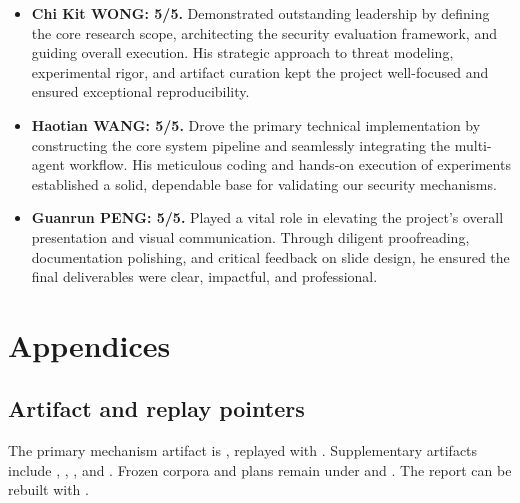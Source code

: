 \documentclass[journal]{IEEEtran}
\begin{document}
\begin{itemize}
\item \textbf{Chi Kit WONG: 5/5.}
    Demonstrated outstanding leadership by defining the core research scope, architecting the security evaluation framework, and guiding overall execution. His strategic approach to threat modeling, experimental rigor, and artifact curation kept the project well-focused and ensured exceptional reproducibility.

    \item \textbf{Haotian WANG: 5/5.}
    Drove the primary technical implementation by constructing the core system pipeline and seamlessly integrating the multi-agent workflow. His meticulous coding and hands-on execution of experiments established a solid, dependable base for validating our security mechanisms.

    \item \textbf{Guanrun PENG: 5/5.}
    Played a vital role in elevating the project's overall presentation and visual communication. Through diligent proofreading, documentation polishing, and critical feedback on slide design, he ensured the final deliverables were clear, impactful, and professional.
\end{itemize}



\clearpage



\newpage
\section*{Appendices}

\subsection*{Artifact and replay pointers}

{\raggedright
The primary mechanism artifact is
, replayed with
. Supplementary artifacts include
,
,
, and
. Frozen corpora and plans
remain under  and . The report can be
rebuilt with .\par}
\end{document}
